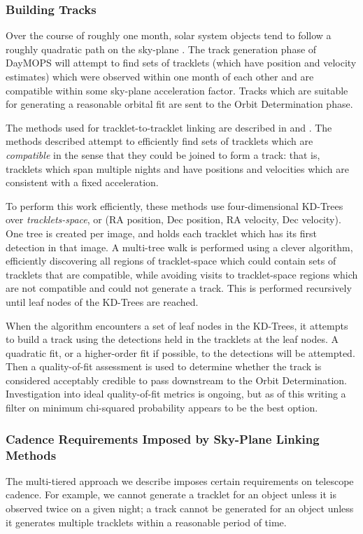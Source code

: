 \documentclass[12pt,preprint]{aastex}
\begin{document}
\subsubsection{Building Tracks}

Over the course of roughly one month, solar system objects tend to
follow a roughly quadratic path on the sky-plane
\citep{kubica_thesis}.  The track generation phase of DayMOPS will
attempt to find sets of tracklets (which have position and velocity
estimates) which were observed within one month of each other and are
compatible within some sky-plane acceleration factor.  Tracks which
are suitable for generating a reasonable orbital fit are sent to the
Orbit Determination phase. 

The methods used for tracklet-to-tracklet linking are described in
\citet{kubica_thesis} and \citet{Kubica:2005:MTA:1081870.1081889}.
The methods described attempt to efficiently find sets of tracklets
which are \textit{compatible} in the sense that they could be joined
to form a track: that is, tracklets which span multiple nights and
have positions and velocities which are consistent with a fixed
acceleration.  

To perform this work efficiently, these methods use four-dimensional
KD-Trees over \textit{tracklets-space}, or (RA position, Dec position,
RA velocity, Dec velocity). One tree is created per image, and holds
each tracklet which has its first detection in that image.  A
multi-tree walk is performed using a clever algorithm, efficiently
discovering all regions of tracklet-space which could contain sets of
tracklets that are compatible, while avoiding visits to tracklet-space
regions which are not compatible and could not generate a track.  This
is performed recursively until leaf nodes of the KD-Trees are reached.


When the algorithm encounters a set of leaf nodes in the KD-Trees, it
attempts to build a track using the detections held in the tracklets
at the leaf nodes.  A quadratic fit, or a higher-order fit if
possible, to the detections will be attempted.  Then a quality-of-fit
assessment is used to determine whether the track is considered
acceptably credible to pass downstream to the Orbit Determination.
Investigation into ideal quality-of-fit metrics is ongoing, but as of
this writing a filter on minimum chi-squared probability appears to be
the best option.




\subsubsection{Cadence Requirements Imposed by Sky-Plane Linking Methods}
\label{cadenceRequirements}
The multi-tiered approach we describe imposes certain requirements on
telescope cadence.  For example, we cannot generate a tracklet for an
object unless it is observed twice on a given night; a track cannot be
generated for an object unless it generates multiple tracklets within
a reasonable period of time.  
\end{document}
